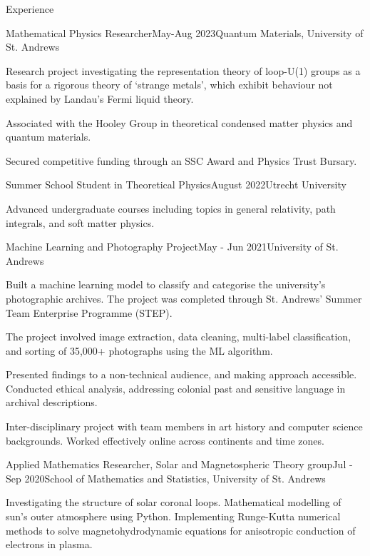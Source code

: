 \documentclass{resume} %
\begin{document}
\begin{rSection}{Experience}
\begin{rSubsection}{Mathematical Physics Researcher}{May-Aug 2023}{Quantum Materials, University of St. Andrews}
\item{Research project investigating the representation theory of loop-U(1) groups as a basis for a rigorous theory of `strange metals', which exhibit behaviour not explained by Landau's Fermi liquid theory.}
\item{Associated with the Hooley Group in theoretical condensed matter physics and quantum materials.}
\item{Secured competitive funding through an SSC Award and Physics Trust Bursary.}
\end{rSubsection}

\begin{rSubsection}{Summer School Student in Theoretical Physics}{August 2022}{Utrecht University}

\item Advanced undergraduate courses including topics in general relativity, path integrals, and soft matter physics.
    
\end{rSubsection}

\begin{rSubsection}{Machine Learning and Photography Project}{May - Jun 2021}{University of St. Andrews}

\item{Built a machine learning model to classify and categorise the university’s photographic archives. The project was completed through St. Andrews’ Summer Team Enterprise Programme (STEP).}
\item{The project involved image extraction, data cleaning, multi-label classification, and sorting of 35,000+ photographs using the ML algorithm.}
\item{Presented findings to a non-technical audience, and making approach accessible. Conducted ethical analysis, addressing colonial past and sensitive language in archival descriptions.}
\item{Inter-disciplinary project with team members in art history and computer science backgrounds. Worked effectively online across continents and time zones.}
\end{rSubsection}

\begin{rSubsection}{Applied Mathematics Researcher, Solar and Magnetospheric Theory group}{Jul - Sep 2020}{School of Mathematics and Statistics, University of St. Andrews}

\item{Investigating the structure of solar coronal loops. Mathematical modelling of sun's outer atmosphere using Python. Implementing Runge-Kutta numerical methods to solve magnetohydrodynamic equations for anisotropic conduction of electrons in plasma.}    
\end{rSubsection}



\end{rSection}
\end{document}
